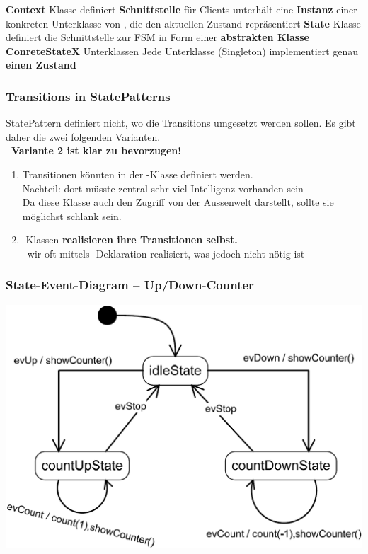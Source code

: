 \begin{outline}
    \1 \textbf{Context}-Klasse
        \2 definiert \textbf{Schnittstelle} für Clients
        \2 unterhält eine \textbf{Instanz} einer konkreten Unterklasse von , die den aktuellen Zustand repräsentiert
    \1 \textbf{State}-Klasse
        \2 definiert die Schnittstelle zur FSM in Form einer \textbf{abstrakten Klasse}
    \1 \textbf{ConreteStateX} Unterklassen
        \2 Jede Unterklasse (Singleton) implementiert genau \textbf{einen Zustand}
\end{outline}


\subsubsection{Transitions in StatePatterns}

StatePattern definiert nicht, wo die Transitions umgesetzt werden sollen. Es gibt daher die zwei folgenden Varianten. \\
\textbf{ \textrightarrow\ Variante 2 ist klar zu bevorzugen!}

\vspace{0.2cm}

\begin{enumerate}
    \item Transitionen könnten in der -Klasse definiert werden. \\
        Nachteil: dort müsste zentral sehr viel Intelligenz vorhanden sein \\
        Da diese Klasse auch den Zugriff von der Aussenwelt darstellt, sollte sie möglichst schlank sein.
    \item {}-Klassen \textbf{realisieren ihre Transitionen selbst.} \\
        \textrightarrow\ wir oft mittels -Deklaration realisiert, was jedoch nicht nötig ist
\end{enumerate}


\subsubsection{State-Event-Diagram -- Up/Down-Counter}
\label{State-Event-Diagram -- Up/Down-Counter - StatePattern}

\begin{center}
    \includegraphics[width=0.75\columnwidth]{images/fsm_up-down-counter_diagramm_state_pattern.png}
\end{center}


